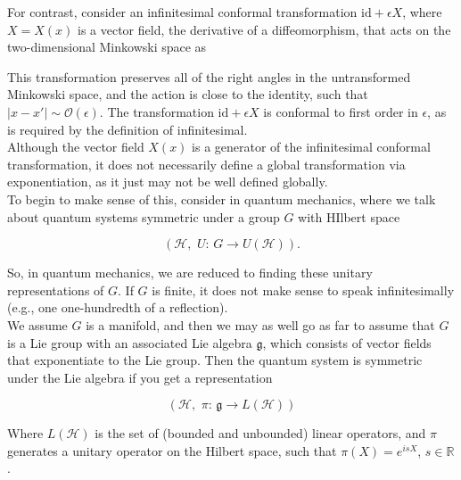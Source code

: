 \documentclass[10pt]{article}
\begin{document}
\noindent For contrast, consider an infinitesimal conformal transformation $\text{id} + \epsilon X$, where $X=X(x)$ is a vector field, the derivative of a diffeomorphism, that acts on the two-dimensional Minkowski space as

\begin{figure}[H]
	\centering
\end{figure} 

\noindent This transformation preserves all of the right angles in the untransformed Minkowski space, and the action is close to the identity, such that $|x-x'| \sim \mathcal{O}(\epsilon)$. The transformation $\text{id} + \epsilon X$ is conformal to first order in $\epsilon$, as is required by the definition of infinitesimal. \\

\noindent Although the vector field $X(x)$ is a generator of the infinitesimal conformal transformation, it does not necessarily define a global transformation via exponentiation, as it just may not be well defined globally.\\

\noindent To begin to make sense of this, consider in quantum mechanics, where we talk about quantum systems symmetric under a group $G$ with HIlbert space 

\begin{equation}
(\mathcal{H}, \,\, U: \, G \rightarrow U(\mathcal{H})).
\end{equation}

\noindent So, in quantum mechanics, we are reduced to finding these unitary representations of $G$. If $G$ is finite, it does not make sense to speak infinitesimally (e.g., one one-hundredth of a reflection). \\

\noindent We assume $G$ is a manifold, and then we may as well go as far to assume that $G$ is a Lie group with an associated Lie algebra $\mathfrak{g}$, which consists of vector fields that exponentiate to the Lie group. Then the quantum system is symmetric under the Lie algebra if you get a representation

\begin{equation}
(\mathcal{H}, \, \, \pi: \, \mathfrak{g} \rightarrow L(\mathcal{H}))
\end{equation}

\noindent Where $L(\mathcal{H})$ is the set of (bounded and unbounded) linear operators, and $\pi$ generates a unitary operator on the Hilbert space, such that $\pi(X)= e^{isX}$, $s\in \mathbb{R}$. \\
\end{document}
